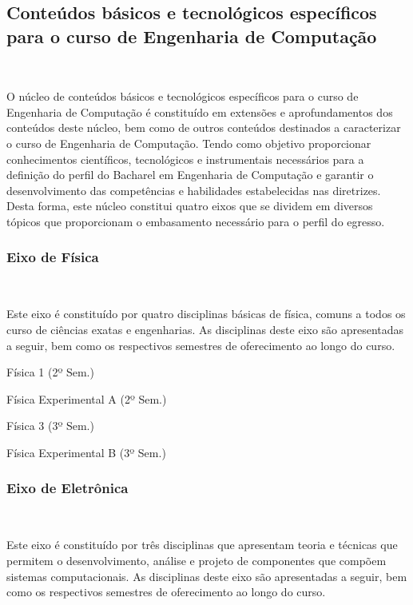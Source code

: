 \subsection{Conteúdos básicos e tecnológicos específicos para o curso de Engenharia de Computação}~\label{sec:cb_tec}

O núcleo de conteúdos básicos e tecnológicos específicos para o curso de Engenharia de Computação é constituído em extensões e aprofundamentos dos conteúdos deste núcleo, bem como de outros conteúdos destinados a caracterizar o curso de Engenharia de Computação. Tendo como objetivo proporcionar conhecimentos científicos, tecnológicos e instrumentais necessários para a definição do perfil do Bacharel em Engenharia de Computação e garantir o desenvolvimento das competências e habilidades estabelecidas nas diretrizes. Desta forma, este núcleo constitui quatro eixos que se dividem em diversos tópicos que proporcionam o embasamento necessário para o perfil do egresso.

\subsubsection{Eixo de Física}~\label{sec:E2}

Este eixo é constituído por quatro disciplinas básicas de física, comuns a todos os curso de ciências exatas e engenharias. As disciplinas deste eixo são apresentadas a seguir, bem como os respectivos semestres de oferecimento ao longo do curso.

\begin{compenum}
    \item Física 1 (2º Sem.)
    \item Física Experimental A (2º Sem.)
    \item Física 3 (3º Sem.)
    \item Física Experimental B (3º Sem.)

\end{compenum}

\subsubsection{Eixo de Eletrônica}~\label{sec:E3}

Este eixo é constituído por três disciplinas que apresentam teoria e técnicas que permitem o desenvolvimento, análise e projeto de componentes que compõem sistemas computacionais. As disciplinas deste eixo são apresentadas a seguir, bem como os respectivos semestres de oferecimento ao longo do curso.

